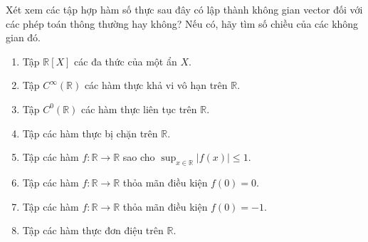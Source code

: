 \documentclass[class=linearalgebra,crop=false]{standalone}
\begin{document}
\begin{exercise}Xét xem các tập hợp hàm số thực sau đây có lập thành không gian vector đối với các phép toán thông thường hay không? Nếu có, hãy tìm số chiều của các không gian đó.
    \begin{enumerate}[label*= (\alph*),itemsep=0pt]
        \item Tập $\mathbb{R}[X]$ các đa thức của một ẩn $X$.
        \item Tập $C^{\infty}(\mathbb{R})$ các hàm thực khả vi vô hạn trên $\mathbb{R}$.
        \item Tập $C^{0}(\mathbb{R})$ các hàm thực liên tục trên $\mathbb{R}$.
        \item Tập các hàm thực bị chặn trên $\mathbb{R}$.
        \item Tập các hàm $f: \mathbb{R}\rightarrow\mathbb{R}$ sao cho $\sup_{x\in\mathbb{R}}|f(x)| \le 1$.
        \item Tập các hàm $f: \mathbb{R}\rightarrow\mathbb{R}$ thỏa mãn điều kiện $f(0) = 0$.
        \item Tập các hàm $f: \mathbb{R}\rightarrow\mathbb{R}$ thỏa mãn điều kiện $f(0) = -1$.
        \item Tập các hàm thực đơn điệu trên $\mathbb{R}$.
    \end{enumerate}
\end{exercise}
\end{document}
